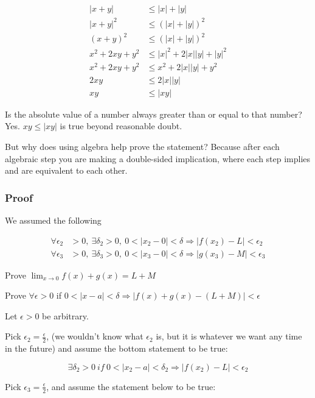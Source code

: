 \documentclass[
]{article}
\begin{document}
\begin{align*}
|x + y| &\leq |x| + |y|
 \\
|x + y|^{2} &\leq \left( |x| + |y| \right)^{2}
 \\
(x + y)^{2} &\leq \left( |x| + |y| \right)^{2}
 \\
x^{2} + 2xy + y^{2} &\leq |x|^{2} + 2|x||y| + |y|^{2}
 \\
x^{2} + 2xy + y^{2} &\leq x^{2} + 2|x||y| + y^{2}
 \\
2xy &\leq 2|x||y|
 \\
xy &\leq |xy|
\end{align*}


Is the absolute value of a number always greater than or equal to that
number? Yes. $xy \leq |xy|$ is true beyond reasonable doubt.

But why does using algebra help prove the statement? Because after each
algebraic step you are making a double-sided implication, where each
step implies and are equivalent to each other.


\subsubsection{Proof}

We assumed the following

\begin{align*}
\forall\epsilon_{2} &> 0,\ \exists\delta_{2} > 0,\ 0 < \left| x_{2} - 0 \right| < \delta \Rightarrow \left| f\left( x_{2} \right) - L \right| < \epsilon_{2}
 \\
\forall\epsilon_{3} &> 0,\ \exists\delta_{3} > 0,\ 0 < |x_{3} - 0| < \delta \Rightarrow |g(x_{3}) - M| < \epsilon_{3}
\end{align*}


Prove $\lim_{x \rightarrow 0}{f(x) + g(x)} = L + M$

Prove $\forall\epsilon > 0$ if
$0 < |x - a| < \delta \Rightarrow \left| f(x) + g(x) - (L + M) \right| < \epsilon$

Let $\epsilon > 0$ be arbitrary.

Pick $\epsilon_{2} = \frac{\epsilon}{2}$, (we wouldn't know what
$\epsilon_{2}$ is, but it is whatever we want any time in the future)
and assume the bottom statement to be true:

$$\exists\delta_{2} > 0\ if\ 0 < \left| x_{2} - a \right| < \delta_{2} \Rightarrow \left| f\left( x_{2} \right) - L \right| < \epsilon_{2}$$

Pick $\epsilon_{3} = \frac{\epsilon}{2}$, and assume the statement
below to be true:
\end{document}

